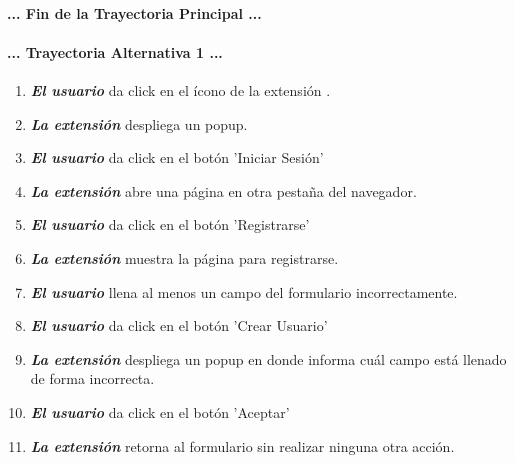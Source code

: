 \documentclass[12pt, a4paper, titlepage]{report}
\newcommand*{\img}[1]{%
    \raisebox{-.3\baselineskip}{%
        \texttt{[image: \#1]}%
    }%
}
\begin{document}
				\paragraph{... Fin de la Trayectoria Principal ...}
				
				
				\paragraph{... Trayectoria Alternativa 1 ...}
				\begin{enumerate}
				    
				    \item \textbf{\textit{El usuario}} da click en el ícono de la extensión \img{imagenes/Disenio/Componente_1/UI_icon_escom.png}.
				    
				    \item \textbf{\textit{La extensión}} despliega un popup.
					
					\item \textbf{\textit{El usuario}} da click en el botón 'Iniciar Sesión' \img{imagenes/Disenio/Componente_1/UI_btn_login.png}
					
					\item \textbf{\textit{La extensión}} abre una página en otra pestaña del navegador.
					
					\item \textbf{\textit{El usuario}} da click en el botón 'Registrarse' \img{imagenes/Disenio/Componente_1/UI_btn_logup.png}
					
					\item \textbf{\textit{La extensión}} muestra la página para registrarse.
					
					\item \textbf{\textit{El usuario}} llena al menos un campo del formulario incorrectamente.
					
					\item \textbf{\textit{El usuario}} da click en el botón 'Crear Usuario' \img{imagenes/Disenio/Componente_1/UI_btn_newUser.png}
					
					\item \textbf{\textit{La extensión}} despliega un popup en donde informa cuál campo está llenado de forma incorrecta.
					
					\item \textbf{\textit{El usuario}} da click en el botón 'Aceptar' \img{imagenes/Disenio/Componente_1/UI_btn_accept.png}
					
					\item \textbf{\textit{La extensión}} retorna al formulario sin realizar ninguna otra acción.
				\end{enumerate}
\end{document}
